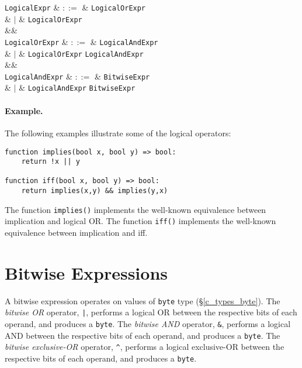\begin{syntax}
  \verb+LogicalExpr+ & $::=$ & \verb+LogicalOrExpr+ \big[ \token{<==>} \verb+LogicalExpr+\ \big]\\
                     &  $|$  & \verb+LogicalOrExpr+ \big[ \token{==>} \verb+LogicalExpr+\ \big]\\
  &&\\
  \verb+LogicalOrExpr+ & $::=$ & \verb+LogicalAndExpr+ \\
                           & $|$ & \verb+LogicalOrExpr+ \token{||} \verb+LogicalAndExpr+\\
  &&\\
  \verb+LogicalAndExpr+ & $::=$ & \verb+BitwiseExpr+ \\
                            & $|$ & \verb+LogicalAndExpr+ \token{\&\&} \verb+BitwiseExpr+\\
\end{syntax}

\paragraph{Example.}  The following examples illustrate some of the logical operators:

\begin{lstlisting}
function implies(bool x, bool y) => bool:
    return !x || y

function iff(bool x, bool y) => bool:
    return implies(x,y) && implies(y,x)
\end{lstlisting}

The function \lstinline{implies()} implements the well-known equivalence between implication and logical OR.  The function \lstinline{iff()} implements the well-known equivalence between implication and iff.


\section{Bitwise Expressions}
\label{c_expr_bitwise}
A bitwise expression operates on values of \lstinline{byte} type (\S\ref{c_types_byte}).  The {\em bitwise OR} operator, \lstinline{|}, performs a logical OR between the respective bits of each operand, and produces a \lstinline{byte}.  The {\em bitwise AND} operator, \lstinline{&}, performs a logical AND between the respective bits of each operand, and produces a \lstinline{byte}.   The {\em bitwise exclusive-OR} operator, \lstinline{^}, performs a logical exclusive-OR between the respective bits of each operand, and produces a \lstinline{byte}.

